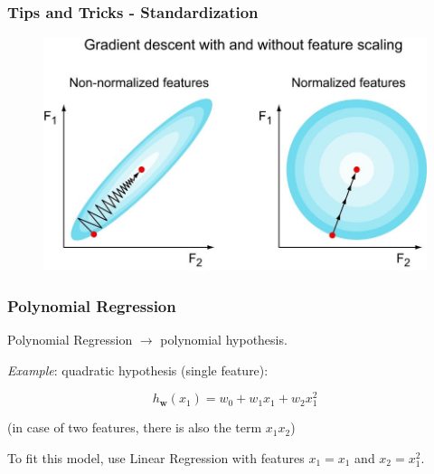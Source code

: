 \documentclass{beamer}
\begin{document}
	\begin{frame}
		\frametitle{Tips and Tricks - Standardization}
		\begin{figure}
			\centering
			\includegraphics[scale=0.35]{images/feature-scaling}
		\end{figure}

		
	\end{frame}



	\begin{frame}
		\frametitle{Polynomial Regression}
		Polynomial Regression $\rightarrow$ polynomial hypothesis.
		
		\vspace{5mm}
		
		\textit{Example}: quadratic hypothesis (single feature):	
		
		$$h_{\bm{w}}(x_1) = w_0 + w_1 x_1 + w_2 x_1^2$$
		
		(in case of two features, there is also the term $x_1 x_2$)
		
		\vspace{5mm}
		
		To fit this model, use Linear Regression with features $x_1 = x_1$ and $x_2 = x_1^2$.
	\end{frame}
\end{document}
